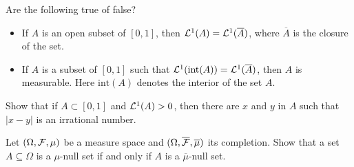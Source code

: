 \begin{problem}
    Are the following true of false?
    \begin{itemize}
        \item If $A$ is an open subset of $[0, 1]$, then $\mathcal L^1(A) = \mathcal L^1(\overline{A})$, where $\overline{A}$ is the closure of the set.
        \item If $A$ is a subset of $[0, 1]$ such that $\mathcal L^1(\mathrm{int}(A)) = \mathcal L^1(\overline{A})$, then $A$ is measurable. Here $\mathrm{int}(A)$ denotes the interior of the set $A$.
    \end{itemize}
\end{problem}

\begin{problem}
Show that if $A \subset [0, 1]$ and $\mathcal L^1(A) > 0$, then there are $x$ and $y$
in $A$ such that $|x - y|$ is an irrational number.
\end{problem}

\begin{problem}
    Let $(\Omega,\mathcal F,\mu)$ be a measure space and $(\Omega,\overline{\mathcal F},\overline{\mu})$ its completion. Show that a set $A\subseteq \Omega$ is a $\mu$-null set if and only if $A$ is a $\overline{\mu}$-null set.
\end{problem}